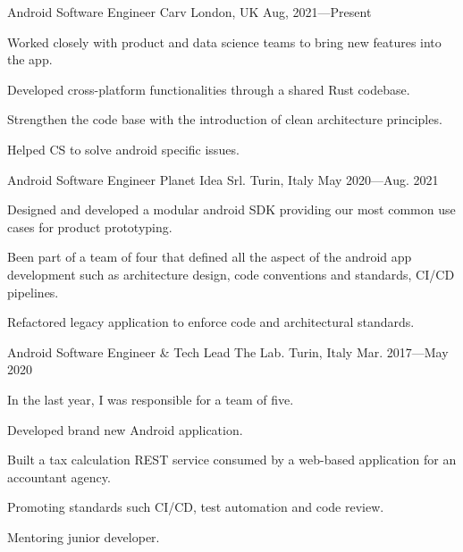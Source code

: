 

\begin{cventries}

  \cventry
  {Android Software Engineer} %
  {Carv} %
  {London, UK} %
  {Aug, 2021—Present} %
  {
    \begin{cvitems} %
      \item {Worked closely with product and data science teams to bring new features into the app.}
      \item {Developed cross-platform functionalities through a shared Rust codebase.}
      \item {Strengthen the code base with the introduction of clean architecture principles.}
      \item {Helped CS to solve android specific issues.}
    \end{cvitems}
  }

  \cventry
  {Android Software Engineer} %
  {Planet Idea Srl.} %
  {Turin, Italy} %
  {May 2020—Aug. 2021} %
  {
    \begin{cvitems} %
      \item {Designed and developed a modular android SDK providing our most common use cases for product prototyping.}
      \item {Been part of a team of four that defined all the aspect of the android app development such as architecture design, code conventions and standards, CI/CD pipelines.}
      \item {Refactored legacy application to enforce code and architectural standards.}
    \end{cvitems}
  }

  \cventry
  {Android Software Engineer \& Tech Lead} %
  {The Lab.} %
  {Turin, Italy} %
  {Mar. 2017—May 2020} %
  {
    \begin{cvitems} %
      \item {In the last year, I was responsible for a team of five.}
      \item {Developed brand new Android application.}
      \item {Built a tax calculation REST service consumed by a web-based application for an accountant agency.}
      \item {Promoting standards such CI/CD, test automation and code review.}
      \item {Mentoring junior developer.}
    \end{cvitems}
  }


\end{cventries}
